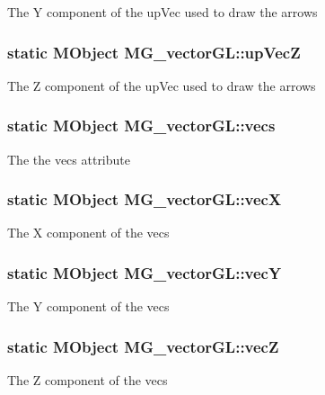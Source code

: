 The Y component of the up\-Vec used to draw the arrows \hypertarget{class_m_g__vector_g_l_aa5348daa3385f54237190545cdf21009}{
\subsubsection[{up\-Vec\-Z}]{\setlength{\rightskip}{0pt plus 5cm}static M\-Object M\-G\-\_\-vector\-G\-L\-::up\-Vec\-Z\hspace{0.3cm}{\ttfamily [static]}}}\label{class_m_g__vector_g_l_aa5348daa3385f54237190545cdf21009}
The Z component of the up\-Vec used to draw the arrows \hypertarget{class_m_g__vector_g_l_a7e8fcd12774565e52cfc9a088426fda5}{
\subsubsection[{vecs}]{\setlength{\rightskip}{0pt plus 5cm}static M\-Object M\-G\-\_\-vector\-G\-L\-::vecs\hspace{0.3cm}{\ttfamily [static]}}}\label{class_m_g__vector_g_l_a7e8fcd12774565e52cfc9a088426fda5}
The the vecs attribute \hypertarget{class_m_g__vector_g_l_a6eeaca2cfdf01a1cde7727a7d02e9fb8}{
\subsubsection[{vec\-X}]{\setlength{\rightskip}{0pt plus 5cm}static M\-Object M\-G\-\_\-vector\-G\-L\-::vec\-X\hspace{0.3cm}{\ttfamily [static]}}}\label{class_m_g__vector_g_l_a6eeaca2cfdf01a1cde7727a7d02e9fb8}
The X component of the vecs \hypertarget{class_m_g__vector_g_l_ab83a515ef8a0389db4fffdd27deb0a15}{
\subsubsection[{vec\-Y}]{\setlength{\rightskip}{0pt plus 5cm}static M\-Object M\-G\-\_\-vector\-G\-L\-::vec\-Y\hspace{0.3cm}{\ttfamily [static]}}}\label{class_m_g__vector_g_l_ab83a515ef8a0389db4fffdd27deb0a15}
The Y component of the vecs \hypertarget{class_m_g__vector_g_l_a793496afb749c8d022fb487e7cb7ef50}{
\subsubsection[{vec\-Z}]{\setlength{\rightskip}{0pt plus 5cm}static M\-Object M\-G\-\_\-vector\-G\-L\-::vec\-Z\hspace{0.3cm}{\ttfamily [static]}}}\label{class_m_g__vector_g_l_a793496afb749c8d022fb487e7cb7ef50}
The Z component of the vecs 

